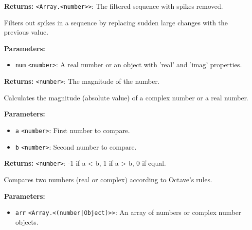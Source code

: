 \documentclass[12pt,a4paper]{article}
\begin{document}
\noindent \textbf{Returns:} \texttt{<Array.<number>>}: The filtered sequence with spikes removed.

\noindent Filters out spikes in a sequence by replacing sudden large changes with the previous value.

\vspace{5mm}
\noindent {}


\noindent \textbf{Parameters:}
\begin{itemize}
  \item \texttt{num} \texttt{<number>}: A real number or an object with 'real' and 'imag' properties.
\end{itemize}

\noindent \textbf{Returns:} \texttt{<number>}: The magnitude of the number.

\noindent Calculates the magnitude (absolute value) of a complex number or a real number.

\vspace{5mm}
\noindent {}


\noindent \textbf{Parameters:}
\begin{itemize}
  \item \texttt{a} \texttt{<number>}: First number to compare.
  \item \texttt{b} \texttt{<number>}: Second number to compare.
\end{itemize}

\noindent \textbf{Returns:} \texttt{<number>}: -1 if a < b, 1 if a > b, 0 if equal.

\noindent Compares two numbers (real or complex) according to Octave's rules.

\vspace{5mm}
\noindent {}


\noindent \textbf{Parameters:}
\begin{itemize}
  \item \texttt{arr} \texttt{<Array.<(number|Object)>>}: An array of numbers or complex number objects.
\end{itemize}
\end{document}
